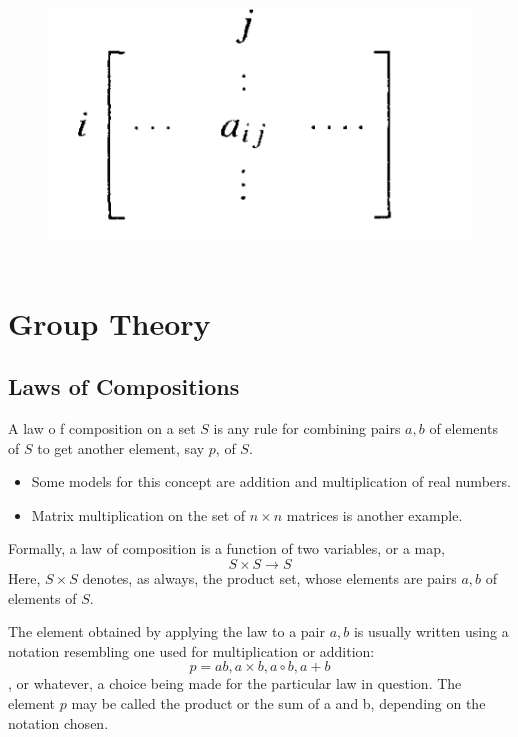 \documentclass[
]{book}
\providecommand{\tightlist}{%
  \setlength{\itemsep}{0pt}\setlength{\parskip}{0pt}}
\begin{document}
\begin{figure}
\centering
\includegraphics{figures/ch_1/fig02.png}
\caption{\(~\)}
\end{figure}

\hypertarget{group-theory}{%
\chapter{Group Theory}\label{group-theory}}

\hypertarget{laws-of-compositions}{%
\section{Laws of Compositions}\label{laws-of-compositions}}

\leavevmode{}%
A law o f composition on a set \(S\) is any rule for combining pairs
\(a, b\) of elements of \(S\) to get another element, say \(p\), of
\(S\).

\hypertarget{unnamed-chunk-3}{}
\begin{itemize}
\tightlist
\item
  Some models for this concept are addition and multiplication of real
  numbers.
\item
  Matrix multiplication on the set of \(n \times n\) matrices is another
  example.
\end{itemize}

Formally, a law of composition is a function of two variables, or a map,
\[S\times S \to S\] Here, \(S \times S\) denotes, as always, the product
set, whose elements are pairs \(a, b\) of elements of \(S\).

The element obtained by applying the law to a pair \(a, b\) is usually
written using a notation resembling one used for multiplication or
addition: \[p = ab, a \times b, a \circ b, a + b\], or whatever, a
choice being made for the particular law in question. The element \(p\)
may be called the product or the sum of a and b, depending on the
notation chosen.
\end{document}
